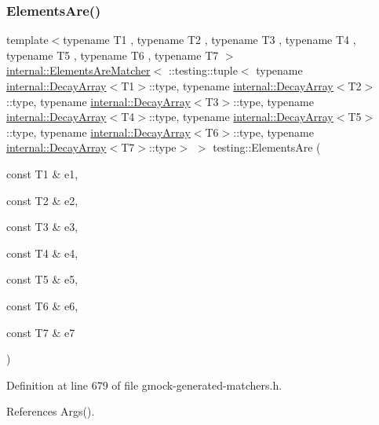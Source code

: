 \subsubsection{\texorpdfstring{Elements\+Are()}{ElementsAre()}\hspace{0.1cm}{\footnotesize\ttfamily [8/11]}}
{\footnotesize\ttfamily template$<$typename T1 , typename T2 , typename T3 , typename T4 , typename T5 , typename T6 , typename T7 $>$ \\
\hyperlink{classtesting_1_1internal_1_1ElementsAreMatcher}{internal\+::\+Elements\+Are\+Matcher}$<$ \+::testing\+::tuple$<$ typename \hyperlink{structtesting_1_1internal_1_1DecayArray}{internal\+::\+Decay\+Array}$<$T1$>$\+::type, typename \hyperlink{structtesting_1_1internal_1_1DecayArray}{internal\+::\+Decay\+Array}$<$T2$>$\+::type, typename \hyperlink{structtesting_1_1internal_1_1DecayArray}{internal\+::\+Decay\+Array}$<$T3$>$\+::type, typename \hyperlink{structtesting_1_1internal_1_1DecayArray}{internal\+::\+Decay\+Array}$<$T4$>$\+::type, typename \hyperlink{structtesting_1_1internal_1_1DecayArray}{internal\+::\+Decay\+Array}$<$T5$>$\+::type, typename \hyperlink{structtesting_1_1internal_1_1DecayArray}{internal\+::\+Decay\+Array}$<$T6$>$\+::type, typename \hyperlink{structtesting_1_1internal_1_1DecayArray}{internal\+::\+Decay\+Array}$<$T7$>$\+::type$>$ $>$ testing\+::\+Elements\+Are (\begin{DoxyParamCaption}\item[{const T1 \&}]{e1,  }\item[{const T2 \&}]{e2,  }\item[{const T3 \&}]{e3,  }\item[{const T4 \&}]{e4,  }\item[{const T5 \&}]{e5,  }\item[{const T6 \&}]{e6,  }\item[{const T7 \&}]{e7 }\end{DoxyParamCaption})\hspace{0.3cm}{\ttfamily [inline]}}



Definition at line 679 of file gmock-\/generated-\/matchers.\+h.



References Args().


